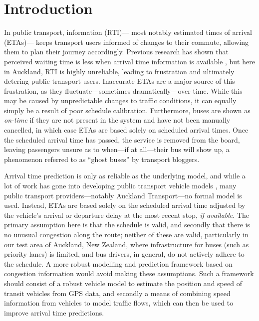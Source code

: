 \section{Introduction}
\label{sec:intro}


In public transport, \rt information (RTI)---%
most notably estimated times of arrival (ETAs)---%
keeps transport users informed of changes to their commute,
allowing them to plan their journey accordingly.
Previous research has shown that perceived waiting time is less
when arrival time information is available \citep{TCRP_2003b},
but here in Auckland, RTI is highly unreliable,
leading to frustration and ultimately detering public transport users.
Inaccurate ETAs are a major source of this frustration,
as they fluctuate---sometimes dramatically---over time.
While this may be caused by unpredictable changes to traffic conditions,
it can equally simply be a result of poor schedule calibration.
Furthermore, buses are shown as \emph{on-time} 
if they are not present in the \rt system and have not been manually cancelled,
in which case ETAs are based solely on scheduled arrival times.
Once the scheduled arrival time has passed,
the service is removed from the \rt board,
leaving passengers unsure as to when---if at all---their bus will show up,
a phenomenon referred to as ``ghost buses'' by transport bloggers.


Arrival time prediction is only as reliable as the underlying model,
and while a lot of work has gone into developing public transport vehicle models
\citep{Cathey_2003,Jeong_2005,Yu_2011,Hans_2015},
many public transport providers---notably Auckland Transport---no formal model is used.
Instead, ETAs are based solely on the scheduled arrival time
adjusted by the vehicle's arrival or departure delay at the most recent stop, 
\emph{if available}.
The primary assumption here is that the schedule is valid,
and secondly that there is no unusual congestion along the route;
neither of these are valid,
particularly in our test area of Auckland, New Zealand,
where infrastructure for buses (such as priority lanes) is limited,
and bus drivers, in general, 
do not actively adhere to the schedule.
A more robust modelling and prediction framework 
based on \rt congestion information would avoid making these assumptions.
Such a framework should consist of a robust vehicle model to estimate the position and speed
of transit vehicles from \rt GPS data,
and secondly a means of combining speed information from vehicles
to model traffic flows,
which can then be used to improve arrival time predictions.


